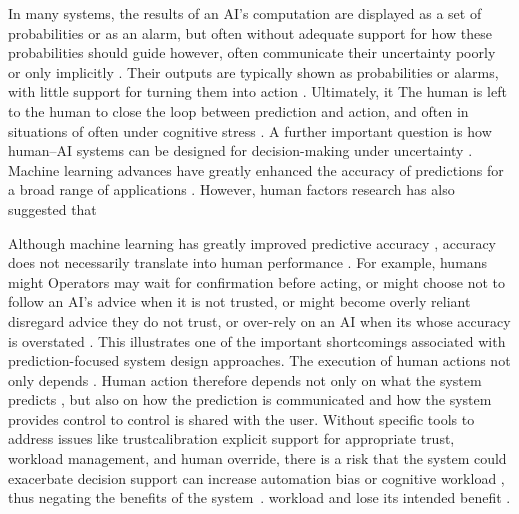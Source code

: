 \documentclass[journal]{IEEEtran}
\theoremstyle{plain}
\theoremstyle{definition}
\providecommand{\DIFaddtex}[1]{{\protect\color{blue} \sf #1}} %
\providecommand{\DIFdeltex}[1]{{\protect\color{red} \scriptsize #1}} %
\providecommand{\DIFaddbegin}{} %
\providecommand{\DIFaddend}{} %
\providecommand{\DIFdelbegin}{} %
\providecommand{\DIFdelend}{} %
\providecommand{\DIFadd}[1]{\texorpdfstring{\DIFaddtex{#1}}{#1}} %
\providecommand{\DIFdel}[1]{\texorpdfstring{\DIFdeltex{#1}}{}} %
\newcommand{\DIFscaledelfig}{0.5}
\newlength{\DIFdelgraphicswidth} %
\newlength{\DIFdelgraphicsheight} %
\newcommand{\DIFaddincludegraphics}[2][]{{\color{blue}\fbox{\DIFOincludegraphics[#1]{#2}}}} %
\newcommand{\DIFdelincludegraphics}[2][]{%
\sbox{\DIFdelgraphicsbox}{\DIFOincludegraphics[#1]{#2}}%
\settoboxwidth{\DIFdelgraphicswidth}{\DIFdelgraphicsbox} %
\settoboxtotalheight{\DIFdelgraphicsheight}{\DIFdelgraphicsbox} %
\scalebox{\DIFscaledelfig}{%
\parbox[b]{\DIFdelgraphicswidth}{\usebox{\DIFdelgraphicsbox}\\[-\baselineskip] \rule{\DIFdelgraphicswidth}{0em}}\llap{\resizebox{\DIFdelgraphicswidth}{\DIFdelgraphicsheight}{%
\setlength{\unitlength}{\DIFdelgraphicswidth}%
\begin{picture}(1,1)%
\thicklines\linethickness{2pt} %
{\color[rgb]{1,0,0}\put(0,0){\framebox(1,1){}}}%
{\color[rgb]{1,0,0}\put(0,0){\line( 1,1){1}}}%
{\color[rgb]{1,0,0}\put(0,1){\line(1,-1){1}}}%
\end{picture}%
}\hspace*{3pt}}} %
} %
\DeclareRobustCommand{\DIFaddbegin}{\DIFOaddbegin \let\includegraphics\DIFaddincludegraphics} %
\DeclareRobustCommand{\DIFaddend}{\DIFOaddend \let\includegraphics\DIFOincludegraphics} %
\DeclareRobustCommand{\DIFdelbegin}{\DIFOdelbegin \let\includegraphics\DIFdelincludegraphics} %
\DeclareRobustCommand{\DIFdelend}{\DIFOaddend \let\includegraphics\DIFOincludegraphics} %
\begin{document}
\DIFdel{In many systems, the results of an AI's computation are displayed as a set of probabilities or as an alarm, but often without adequate support for how these probabilities should guide }\DIFdelend \DIFaddbegin \DIFadd{however, often communicate their uncertainty poorly or only implicitly \cite{McAllister2017IJCAI,Weidinger2022FAccT,Miller2019XRDS}. Their outputs are typically shown as probabilities or alarms, with little support for turning them into }\DIFaddend action \cite{Miller2019XRDS,Bach2024Access}. \DIFdelbegin \DIFdel{Ultimately, it }\DIFdelend \DIFaddbegin \DIFadd{The human }\DIFaddend is left to \DIFdelbegin \DIFdel{the human to }\DIFdelend close the loop between prediction and action, \DIFdelbegin \DIFdel{and often in situations of }\DIFdelend \DIFaddbegin \DIFadd{often under }\DIFaddend cognitive stress \cite{Hodgson2013THMS,Zhang2022THMS}.
\DIFdelbegin \DIFdel{A further important question is how human--AI systems can be designed for decision-making under uncertainty \cite{Lai2023FAccT}.
Machine learning advances have greatly enhanced the accuracy of predictions for a broad range of applications \cite{Mai2024TOS,PerezCerrolaza2024CSUR}. However, human factors research has also suggested that }\DIFdelend \DIFaddbegin 

\DIFadd{Although machine learning has greatly improved predictive accuracy \cite{Mai2024TOS,PerezCerrolaza2024CSUR}, }\DIFaddend accuracy does not necessarily translate into human performance \cite{Lai2023FAccT,Yang2022THMSReview}. \DIFdelbegin \DIFdel{For example, humans might }\DIFdelend \DIFaddbegin \DIFadd{Operators may }\DIFaddend wait for confirmation before acting, \DIFdelbegin \DIFdel{or might choose not to follow an AI's advice when it is not trusted, or might become overly reliant }\DIFdelend \DIFaddbegin \DIFadd{disregard advice they do not trust, or over-rely }\DIFaddend on an AI \DIFdelbegin \DIFdel{when its }\DIFdelend \DIFaddbegin \DIFadd{whose }\DIFaddend accuracy is overstated \DIFdelbegin \DIFdel{\cite{Hodgson2013THMS,Raji2019AIES,Raji2022CACM}.
This illustrates one of the important shortcomings associated with prediction-focused system design approaches. The execution of human actions not only depends }\DIFdelend \DIFaddbegin \DIFadd{\cite{Hodgson2013THMS,Raji2019AIES,Raji2022CACM,Parasuraman2010}. Human action therefore depends not only }\DIFaddend on what the system predicts\DIFaddbegin \DIFadd{, }\DIFaddend but also on how the prediction is communicated and how \DIFdelbegin \DIFdel{the system provides control to }\DIFdelend \DIFaddbegin \DIFadd{control is shared with }\DIFaddend the user. Without \DIFdelbegin \DIFdel{specific tools to address issues like trustcalibration}\DIFdelend \DIFaddbegin \DIFadd{explicit support for appropriate trust}\DIFaddend , workload management, and human override, \DIFdelbegin \DIFdel{there is a risk that the system could exacerbate }\DIFdelend \DIFaddbegin \DIFadd{decision support can increase }\DIFaddend automation bias or \DIFdelbegin \DIFdel{cognitive workload , thus negating the benefits of the system~\cite{Duan2014KDD,Hodgson2013THMS,Zhang2022THMS,Bach2024Access}. }\DIFdelend \DIFaddbegin \DIFadd{workload and lose its intended benefit \cite{Hodgson2013THMS,Zhang2022THMS,Bach2024Access,Lee2004}.
}\DIFaddend 
\end{document}
